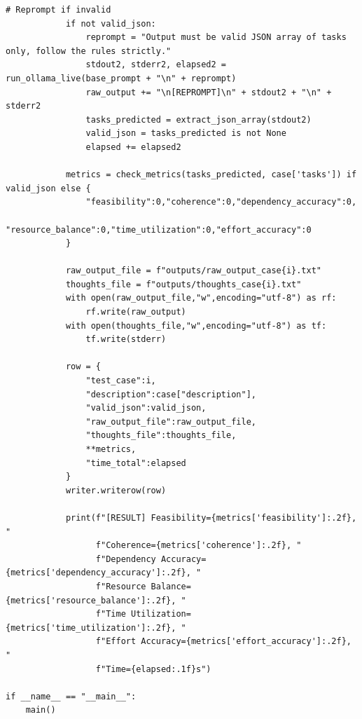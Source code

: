 \documentclass{report}
\begin{document}
\begin{lstlisting}[style=pythonstyle]
            # Reprompt if invalid
            if not valid_json:
                reprompt = "Output must be valid JSON array of tasks only, follow the rules strictly."
                stdout2, stderr2, elapsed2 = run_ollama_live(base_prompt + "\n" + reprompt)
                raw_output += "\n[REPROMPT]\n" + stdout2 + "\n" + stderr2
                tasks_predicted = extract_json_array(stdout2)
                valid_json = tasks_predicted is not None
                elapsed += elapsed2

            metrics = check_metrics(tasks_predicted, case['tasks']) if valid_json else {
                "feasibility":0,"coherence":0,"dependency_accuracy":0,
                "resource_balance":0,"time_utilization":0,"effort_accuracy":0
            }

            raw_output_file = f"outputs/raw_output_case{i}.txt"
            thoughts_file = f"outputs/thoughts_case{i}.txt"
            with open(raw_output_file,"w",encoding="utf-8") as rf:
                rf.write(raw_output)
            with open(thoughts_file,"w",encoding="utf-8") as tf:
                tf.write(stderr)

            row = {
                "test_case":i,
                "description":case["description"],
                "valid_json":valid_json,
                "raw_output_file":raw_output_file,
                "thoughts_file":thoughts_file,
                **metrics,
                "time_total":elapsed
            }
            writer.writerow(row)

            print(f"[RESULT] Feasibility={metrics['feasibility']:.2f}, "
                  f"Coherence={metrics['coherence']:.2f}, "
                  f"Dependency Accuracy={metrics['dependency_accuracy']:.2f}, "
                  f"Resource Balance={metrics['resource_balance']:.2f}, "
                  f"Time Utilization={metrics['time_utilization']:.2f}, "
                  f"Effort Accuracy={metrics['effort_accuracy']:.2f}, "
                  f"Time={elapsed:.1f}s")

if __name__ == "__main__":
    main()
\end{lstlisting}
\end{document}

